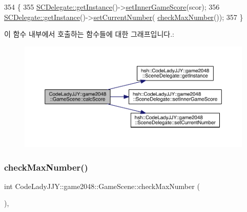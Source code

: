 \begin{DoxyCode}
354                             \{
355         \hyperlink{classhsh_1_1_code_lady_j_j_y_1_1game2048_1_1_scene_delegate_a332a574da455fb687b5d283399a6976c}{SCDelegate::getInstance}()->\hyperlink{classhsh_1_1_code_lady_j_j_y_1_1game2048_1_1_scene_delegate_abd34ec6afe537cccfd469f2e1fc090fc}{setInnerGameScore}(scor);
356         \hyperlink{classhsh_1_1_code_lady_j_j_y_1_1game2048_1_1_scene_delegate_a332a574da455fb687b5d283399a6976c}{SCDelegate::getInstance}()->\hyperlink{classhsh_1_1_code_lady_j_j_y_1_1game2048_1_1_scene_delegate_a5a18f6b50e0a4d8b4a92b13e1fb3fd85}{setCurrentNumber}(
      \hyperlink{class_code_lady_j_j_y_1_1game2048_1_1_game_scene_af5621ff5eb0f168f9c8812c72018a82d}{checkMaxNumber}());
357     \}
\end{DoxyCode}
이 함수 내부에서 호출하는 함수들에 대한 그래프입니다.\+:
\nopagebreak
\begin{figure}[H]
\begin{center}
\leavevmode
\includegraphics[width=350pt]{d1/d76/class_code_lady_j_j_y_1_1game2048_1_1_game_scene_ad08ac2bf0b55768bfbb825dea8d6e6b3_cgraph}
\end{center}
\end{figure}
\mbox{\label{class_code_lady_j_j_y_1_1game2048_1_1_game_scene_af5621ff5eb0f168f9c8812c72018a82d}} 
\subsubsection{\texorpdfstring{check\+Max\+Number()}{checkMaxNumber()}}
{\footnotesize\ttfamily int Code\+Lady\+J\+J\+Y\+::game2048\+::\+Game\+Scene\+::check\+Max\+Number (\begin{DoxyParamCaption}{ }\end{DoxyParamCaption})\hspace{0.3cm}{\ttfamily [inline]}, {\ttfamily [private]}}



